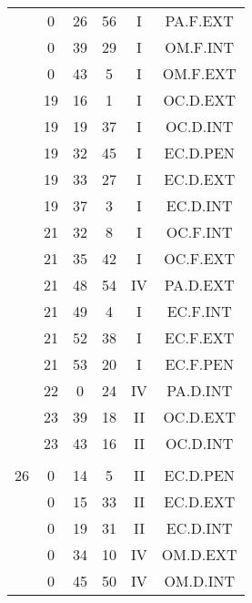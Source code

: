 \documentclass[12pt, a4paper]{article}
\begin{document}
\begin{multicols}{3}
{\begin{tabular}{c c c c c c}
	 	 	 	 & 0 & 26 & 56 & I & PA.F.EXT\\%
	 	 	 	 & 0 & 39 & 29 & I & OM.F.INT\\%
	 	 	 	 & 0 & 43 & 5 & I & OM.F.EXT\\%
	 	 	 	 & 19 & 16 & 1 & I & OC.D.EXT\\%
	 	 	 	 & 19 & 19 & 37 & I & OC.D.INT\\%
	 	 	 	 & 19 & 32 & 45 & I & EC.D.PEN\\%
	 	 	 	 & 19 & 33 & 27 & I & EC.D.EXT\\%
	 	 	 	 & 19 & 37 & 3 & I & EC.D.INT\\%
	 	 	 	 & 21 & 32 & 8 & I & OC.F.INT\\%
	 	 	 	 & 21 & 35 & 42 & I & OC.F.EXT\\%
	 	 	 	 & 21 & 48 & 54 & IV & PA.D.EXT\\%
	 	 	 	 & 21 & 49 & 4 & I & EC.F.INT\\%
	 	 	 	 & 21 & 52 & 38 & I & EC.F.EXT\\%
	 	 	 	 & 21 & 53 & 20 & I & EC.F.PEN\\%
	 	 	 	 & 22 & 0 & 24 & IV & PA.D.INT\\%
	 	 	 	 & 23 & 39 & 18 & II & OC.D.EXT\\%
	 	 	 	 & 23 & 43 & 16 & II & OC.D.INT\\%
	 	 	 	 & & & & & \\%
	 	 	 	26 & 0 & 14 & 5 & II & EC.D.PEN\\%
	 	 	 	 & 0 & 15 & 33 & II & EC.D.EXT\\%
	 	 	 	 & 0 & 19 & 31 & II & EC.D.INT\\%
	 	 	 	 & 0 & 34 & 10 & IV & OM.D.EXT\\%
	 	 	 	 & 0 & 45 & 50 & IV & OM.D.INT\\%

\end{tabular}}
\end{multicols}
\end{document}

